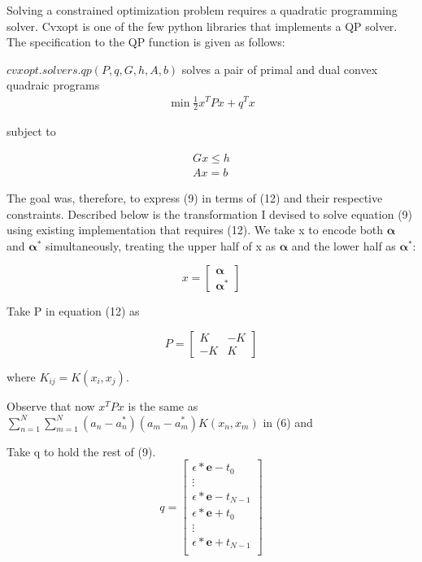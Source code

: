 \documentclass[12pt,twoside,notitlepage]{report}
\begin{document}
Solving a constrained optimization problem requires a quadratic programming solver. Cvxopt is one of the few python
libraries that implements a QP solver. The specification to the QP function is given as follows:

\(cvxopt.solvers.qp(P,q,G,h,A,b)\) solves a pair of primal and dual convex quadraic programs
\begin{gather}
  \min \frac{1}{2} x^T P x + q^T x
\end{gather}

 subject to

\begin{gather}
 G x \leq h\\
  Ax = b
\end{gather}

The goal was, therefore, to express (9) in terms of (12) and their respective constraints.
Described below is the transformation I devised to solve equation (9) using existing implementation that requires (12).
We take x to encode both \(\bm{\alpha}\) and \(\bm{\alpha^*}\) simultaneously, treating the upper half of x as 
\(\bm{\alpha}\) and the lower half 
as \(\bm{\alpha^*}\):


\[x =
  \begin{bmatrix}
    \bm{ \alpha} \\
    \bm{ \alpha^*}
  \end{bmatrix}
\]

Take P in equation (12) as 

\[P =
\begin{bmatrix}
       K & -K           \\
       -K & K            
     \end{bmatrix}
\]

where \(K_{ij} = K(x_i,x_j)\).

Observe that now \(x^T P x\) is the same as 
\(\sum_{n=1}^{N}\sum_{m=1}^{N}(a_n-a_n^*)(a_m-a_m^*)K(x_n,x_m)\) in (6) and 

Take q to hold the rest of (9).
\[q =
\begin{bmatrix}
  \epsilon*\mathbf{e}-t_0           \\
  \vdots                                     \\
  \epsilon*\mathbf{e}-t_{N-1}           \\
   \epsilon*\mathbf{e}+t_0           \\
   \vdots                           \\
  \epsilon*\mathbf{e}+t_{N-1}           \\
     \end{bmatrix}
\]
\end{document}
